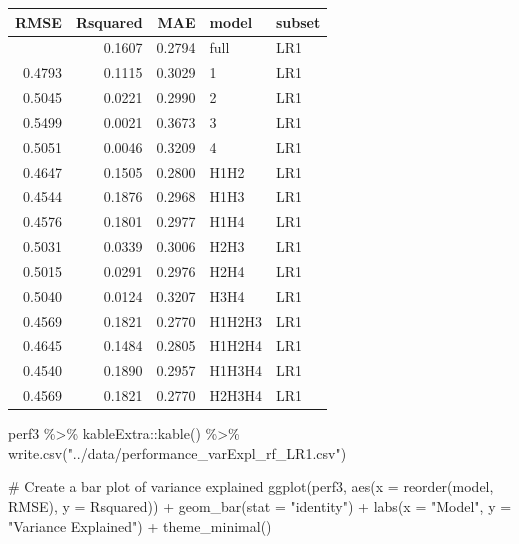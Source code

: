 \documentclass[
  letterpaper,
  DIV=11,
  numbers=noendperiod]{scrreprt}
\newenvironment{Shaded}{\begin{snugshade}}{\end{snugshade}}
\newcommand{\AttributeTok}[1]{\textcolor[rgb]{0.40,0.45,0.13}{#1}}
\newcommand{\CommentTok}[1]{\textcolor[rgb]{0.37,0.37,0.37}{#1}}
\newcommand{\FunctionTok}[1]{\textcolor[rgb]{0.28,0.35,0.67}{#1}}
\newcommand{\NormalTok}[1]{\textcolor[rgb]{0.00,0.23,0.31}{#1}}
\newcommand{\SpecialCharTok}[1]{\textcolor[rgb]{0.37,0.37,0.37}{#1}}
\newcommand{\StringTok}[1]{\textcolor[rgb]{0.13,0.47,0.30}{#1}}
\begin{document}
\begin{longtable}[]{@{}rrrll@{}}
\toprule\noalign{}
RMSE & Rsquared & MAE & model & subset \\
\midrule\noalign{}
\endhead
\bottomrule\noalign{}
\endlastfoot
0.4615 & 0.1607 & 0.2794 & full & LR1 \\
0.4793 & 0.1115 & 0.3029 & 1 & LR1 \\
0.5045 & 0.0221 & 0.2990 & 2 & LR1 \\
0.5499 & 0.0021 & 0.3673 & 3 & LR1 \\
0.5051 & 0.0046 & 0.3209 & 4 & LR1 \\
0.4647 & 0.1505 & 0.2800 & H1H2 & LR1 \\
0.4544 & 0.1876 & 0.2968 & H1H3 & LR1 \\
0.4576 & 0.1801 & 0.2977 & H1H4 & LR1 \\
0.5031 & 0.0339 & 0.3006 & H2H3 & LR1 \\
0.5015 & 0.0291 & 0.2976 & H2H4 & LR1 \\
0.5040 & 0.0124 & 0.3207 & H3H4 & LR1 \\
0.4569 & 0.1821 & 0.2770 & H1H2H3 & LR1 \\
0.4645 & 0.1484 & 0.2805 & H1H2H4 & LR1 \\
0.4540 & 0.1890 & 0.2957 & H1H3H4 & LR1 \\
0.4569 & 0.1821 & 0.2770 & H2H3H4 & LR1 \\
\end{longtable}

\begin{Shaded}
\begin{Highlighting}[]
\NormalTok{perf3 }\SpecialCharTok{\%\textgreater{}\%} 
\NormalTok{    kableExtra}\SpecialCharTok{::}\FunctionTok{kable}\NormalTok{() }\SpecialCharTok{\%\textgreater{}\%} 
    \FunctionTok{write.csv}\NormalTok{(}\StringTok{"../data/performance\_varExpl\_rf\_LR1.csv"}\NormalTok{)}


 \CommentTok{\# Create a bar plot of variance explained}
\FunctionTok{ggplot}\NormalTok{(perf3, }\FunctionTok{aes}\NormalTok{(}\AttributeTok{x =} \FunctionTok{reorder}\NormalTok{(model, RMSE), }\AttributeTok{y =}\NormalTok{ Rsquared)) }\SpecialCharTok{+}
  \FunctionTok{geom\_bar}\NormalTok{(}\AttributeTok{stat =} \StringTok{"identity"}\NormalTok{) }\SpecialCharTok{+}
  \FunctionTok{labs}\NormalTok{(}\AttributeTok{x =} \StringTok{"Model"}\NormalTok{, }\AttributeTok{y =} \StringTok{"Variance Explained"}\NormalTok{) }\SpecialCharTok{+}
  \FunctionTok{theme\_minimal}\NormalTok{()}
\end{Highlighting}
\end{Shaded}
\end{document}
